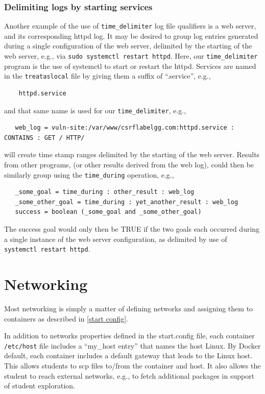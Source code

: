 \documentclass[12pt]{article}
\begin{document}
\subsubsection{Delimiting logs by starting services}
\label{time delimiter services}
Another example of the use of {\tt time\_delimiter} log file qualifiers is a web server,
and its corresponding httpd log.  It may be desired to group log entries generated during a
single configuration of the web server, delimited by the starting of the web server, e.g., via
{\tt sudo systemctl restart httpd}.  Here, our {\tt time\_delimiter} program is the use of systemctl
to start or restart the httpd.  Services are named in the {\tt treataslocal} file by giving them a
suffix of ``.service'', e.g.,
\begin{verbatim}
    httpd.service
\end{verbatim}
\noindent and that same name is used for our {\tt time\_delimiter}, e.g.,
\begin{verbatim}
   web_log = vuln-site:/var/www/csrflabelgg.com:httpd.service : CONTAINS : GET / HTTP/
\end{verbatim} 
\noindent will create time stamp ranges delimited by the starting of the web server.  Results from
other programs, (or other results derived from the web log), could then be similarly group using 
the {\tt time\_during} operation, e.g.,
\begin{verbatim}
   _some_goal = time_during : other_result : web_log
   _some_other_goal = time_during : yet_another_result : web_log
   success = boolean (_some_goal and _some_other_goal) 
\end{verbatim}
The success goal would only then be TRUE if the two goals each occurred during a single instance
of the web server configuration, as delimited by use of {\tt systemctl restart httpd}.

\section{Networking}
Most networking is simply a matter of defining networks and assigning them to containers
as described in \ref{start config}.  

In addition to networks properties defined in the
start.config file, each container \texttt{/etc/host} file includes a ``my\_host entry'' that names
the host Linux.  By Docker default, each container includes a default gateway that
leads to the Linux host.  This allows students to scp files to/from the container and host.
It also allows the student to reach external networks, e.g., to fetch additional packages in
support of student exploration.
\end{document}
